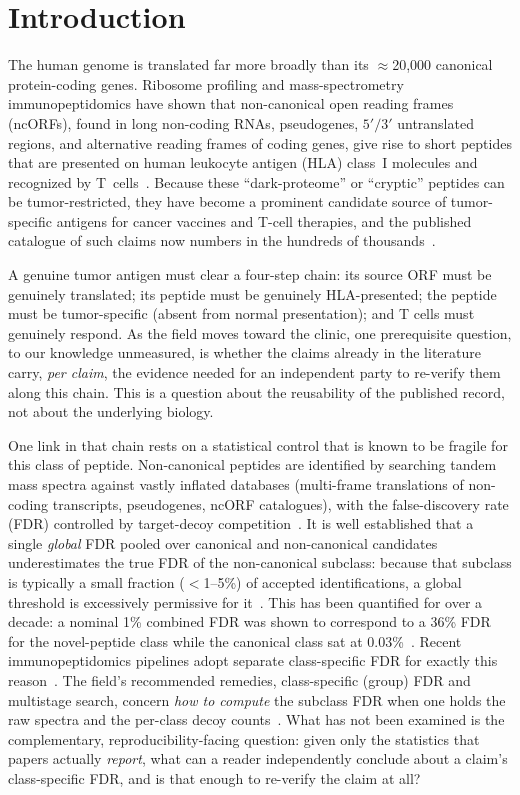\section{Introduction}

The human genome is translated far more broadly than its $\approx$20{,}000 canonical protein-coding genes. Ribosome profiling and mass-spectrometry immunopeptidomics have shown that non-canonical open reading frames (ncORFs), found in long non-coding RNAs, pseudogenes, $5'/3'$ untranslated regions, and alternative reading frames of coding genes, give rise to short peptides that are presented on human leukocyte antigen (HLA) class~I molecules and recognized by T~cells~\cite{r13}. Because these ``dark-proteome'' or ``cryptic'' peptides can be tumor-restricted, they have become a prominent candidate source of tumor-specific antigens for cancer vaccines and T-cell therapies, and the published catalogue of such claims now numbers in the hundreds of thousands~\cite{r14,r15}.

A genuine tumor antigen must clear a four-step chain: its source ORF must be genuinely translated; its peptide must be genuinely HLA-presented; the peptide must be tumor-specific (absent from normal presentation); and T cells must genuinely respond. As the field moves toward the clinic, one prerequisite question, to our knowledge unmeasured, is whether the claims already in the literature carry, \emph{per claim}, the evidence needed for an independent party to re-verify them along this chain. This is a question about the reusability of the published record, not about the underlying biology.

One link in that chain rests on a statistical control that is known to be fragile for this class of peptide. Non-canonical peptides are identified by searching tandem mass spectra against vastly inflated databases (multi-frame translations of non-coding transcripts, pseudogenes, ncORF catalogues), with the false-discovery rate (FDR) controlled by target-decoy competition~\cite{r6}. It is well established that a single \emph{global} FDR pooled over canonical and non-canonical candidates underestimates the true FDR of the non-canonical subclass: because that subclass is typically a small fraction ($<$1--5\%) of accepted identifications, a global threshold is excessively permissive for it~\cite{r4,r5,r10,r11}. This has been quantified for over a decade: a nominal 1\% combined FDR was shown to correspond to a 36\% FDR for the novel-peptide class while the canonical class sat at 0.03\%~\cite{r19}. Recent immunopeptidomics pipelines adopt separate class-specific FDR for exactly this reason~\cite{r20}. The field's recommended remedies, class-specific (group) FDR and multistage search, concern \emph{how to compute} the subclass FDR when one holds the raw spectra and the per-class decoy counts~\cite{r5,r10,r11}. What has not been examined is the complementary, reproducibility-facing question: given only the statistics that papers actually \emph{report}, what can a reader independently conclude about a claim's class-specific FDR, and is that enough to re-verify the claim at all?

